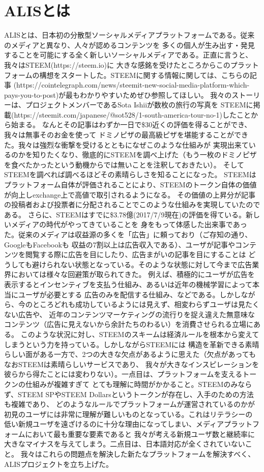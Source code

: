 \documentclass{jsarticle}
\begin{document}
\section{ALISとは}
ALISとは、日本初の分散型ソーシャルメディアプラットフォームである。従来のメディアと異なり、人々が認めるコンテンツを
多くの個人が生み出す・発見することを可能にする全く新しいソーシャルメディアである。正直に言うと、我々はSTEEM(https://steem.io)に
大きな感銘を受けたところからこのプラットフォームの構想をスタートした。STEEMに関する情報に関しては、こちらの記事
(https://cointelegraph.com/news/steemit-new-social-media-platform-which-pays-you-to-post)が最もわかりやすいためぜひ参照してほしい。
我々のストーリーは、プロジェクトメンバーであるSota Ishiiが数枚の旅行の写真を
STEEMに掲載(https://steemit.com/japanese/@sot528/1-south-america-tour-no-1)したことから始まる。
なんとその記事はわずか一日で\$30近くの評価を得ることができ、我々は無事そのお金を使って
ドミノピザの最高級ピザを堪能することができた。我々は強烈な衝撃を受けるとともになぜこのような仕組みが
実現出来ているのかを知りたくなり、徹底的にSTEEMを調べ上げた（もう一枚のドミノピザを食べたかったという動機からでは無いことを注釈しておきたい）。
そしてSTEEMを調べれば調べるほどその素晴らしさを知ることになった。
STEEMはプラットフォーム自体が評価されることにより、STEEMのトークン自体の価値が向上しexchange上で高値で取引されるようになる。
その価値の上昇分が記事の投稿者および投票者に分配されることでこのような仕組みを実現していたのである。
さらに、STEEMはすでに\$3.78億(2017/7/9現在)の評価を得ている。新しいメディアの時代がやってきていることを
身をもって体感した出来事であった。従来のメディアは収益源の多くを「広告」に頼っており（ご存知の通り、GoogleもFacebookも
収益の7割以上は広告収入である）、ユーザが記事やコンテンツを閲覧する際に広告を目にしたり、広告まがいの記事を目にすることは
どうしても避けられない状態となっている。そのような状態に対して今まで広告業界においては様々な回避策が取られてきた。
例えば、積極的にユーザが広告を表示するとインセンティブを支払う仕組み、あるいは近年の機械学習によって本当にユーザが必要とする
広告のみを配信する仕組み、などである。しかしながら、今のところどれも成功しているようには見えず、相変わらずユーザは見たくない広告や、
近年のコンテンツマーケティングの流行りを捉え違えた無意味なコンテンツ（広告に見えないから余計たちのわるい）を消費させられる立場にある。
このような状況に対し、STEEMのスキームは経済ルールを根本から変えてしまうという力を持っている。しかしながらSTEEMには
構造を革新できる素晴らしい面がある一方で、2つの大きな欠点があるように思えた（欠点があってもなおSTEEMは素晴らしいサービスであり、
我々が大きなインスピレーションを彼らから得たことには変わりない）。一点目は、プラットフォームを支えるトークンの仕組みが複雑すぎて
とても理解に時間がかかること。STEEMのみならず、STEEM SPやSTEEM Dollarsというトークンが存在し、入手のための方法も複雑であり、
どのようなルールでプラットフォームが運営されているのかが初見のユーザには非常に理解が難しいものとなっている。これはリテラシーの
低い新規ユーザを遠ざけるのに十分な理由になってしまい、メディアプラットフォームにおいて最も重要な要素であると
我々が考える新規ユーザ数と継続率に大きなマイナスを与えてしまう。二点目は、日本語対応が全くされていないこと。
我々はこれらの問題点を解決した新たなプラットフォームを解決すべく、ALISプロジェクトを立ち上げた。
\end{document}
